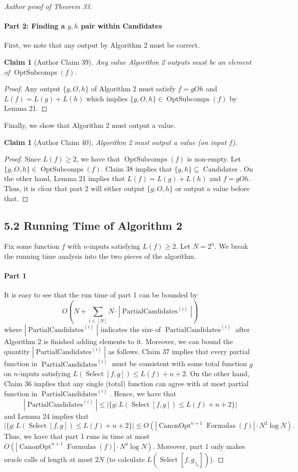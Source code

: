 \documentclass[10pt,a4paper]{article}
\newtheorem{ntclaim}[nttheorem]{Claim}
\newcommand{\Opt}{\operatorname{OptSubcomps}}
\newcommand{\Canon}[1]{\operatorname{CanonOpt}^{#1}\!\operatorname{Formulas}}
\newcommand{\Select}{\operatorname{Select}}
\newcommand{\PC}[1]{\operatorname{PartialCandidates}^{(#1)}}
\newcommand{\Candidates}{\operatorname{Candidates}}
\begin{document}
\begin{proof}[Author proof of Theorem 33]
\paragraph{Part 2: Finding a $g,h$ pair within Candidates}
First, we note that any output by Algorithm 2 must be correct.
\begin{ntclaim}[Author Claim 39]
Any value Algorithm 2 outputs must be an element of $\Opt(f)$.
\end{ntclaim}
\begin{proof}
Any output $\{g,O,h\}$ of Algorithm 2 must satisfy $f=gOh$ and $L(f)=L(g)+L(h)$ which implies $\{g,O,h\}\in\Opt(f)$ by Lemma 21.
\end{proof}
Finally, we show that Algorithm 2 must output a value.
\begin{ntclaim}[Author Claim 40]
Algorithm 2 must output a value (on input $f$).
\end{ntclaim}
\begin{proof}
Since $L(f)\geq 2$, we have that $\Opt(f)$ is non-empty. Let $\{g,O,h\}\in\Opt(f)$.
Claim 38 implies that $\{g,h\}\subseteq\Candidates$. On the other hand, Lemma 21 implies that $L(f)=L(g)+L(h)$ and $f=gOh$. Thus, it is clear that part 2 will either output $\{g,O,h\}$ or output a value before that.
\end{proof}
\subsection*{5.2 Running Time of Algorithm 2}
Fix some function $f$ with $n$-inputs satisfying $L(f)\geq 2$. Let $N=2^n$. We break the running time analysis into the two pieces of the algorithm.
\paragraph{Part 1}
It is easy to see that the run time of part 1 can be bounded by
\[O\left(N+\sum_{i\in[N]}N\cdot|\PC{i}|\right)\]
where $|\PC{i}|$ indicates the size of $\PC{i}$ after Algorithm 2 is finished adding elements to it.
Moreover, we can bound the quantity $|\PC{i}|$ as follows. Claim 37 implies that every partial function in $\PC{i}$ must be consistent with some total function $g$ on $n$-inputs satisfying $L(\Select[f,g])\leq L(f)+n+2$.
On the other hand, Claim 36 implies that any single (total) function can agree with at most partial function in $\PC{i}$. Hence, we have that
\[|\PC{i}|\leq|\{g:L(\Select[f,g])\leq L(f)+n+2\}|\]
and Lemma 24 implies that
\[|\{g:L(\Select[f,g])\leq L(f)+n+2\}|\leq O(|\Canon{n+1}(f)|\cdot N^2\log N).\]
Thus, we have that part 1 runs in time at most $O(|\Canon{n+1}(f)|\cdot N^4\log N)$. Moreover, part 1 only makes oracle calls of length at most $2N$ (to calculate $L(\Select[f,g_{\gamma_b}])$).

\end{proof}
\end{document}
